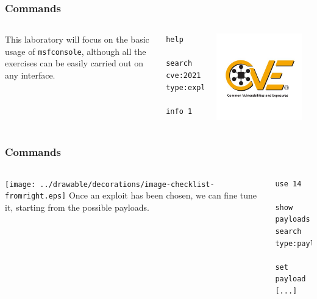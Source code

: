 \documentclass[handout]{beamer}
\begin{document}
\begin{frame}[fragile]
	\frametitle{Commands}

	\begin{columns}
		This laboratory will focus on the basic usage of \texttt{msfconsole}, although all the exercises can be easily carried out on any interface.
		\begin{lstlisting}
help

search cve:2021 type:exploit

info 1
        \end{lstlisting}
		\centering
		\includegraphics[width=0.9\textwidth]{../drawable/decorations/image-cve.jpg}
	\end{columns}

\end{frame}

\begin{frame}[fragile]

	\frametitle{Commands}

	\begin{columns}
		\column{0.4\linewidth}
		\centering
		\texttt{[image: ../drawable/decorations/image-checklist-fromright.eps]}
		\column{0.6\linewidth}
		Once an exploit has been chosen, we can fine tune it, starting from the possible payloads.
		\begin{lstlisting}
use 14

show payloads 
search type:payload 

set payload [...]
        \end{lstlisting}
	\end{columns}

\end{frame}
\end{document}
